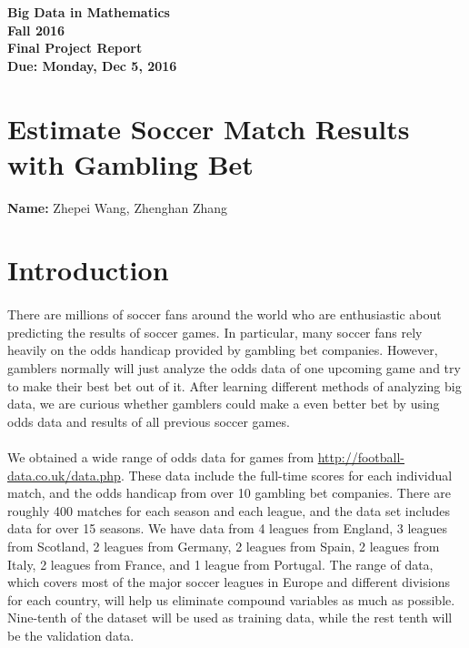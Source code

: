 \documentclass[12pt]{article}
\newcommand{\Name}[1]{\noindent \textbf{Name:} #1 \\}
\begin{document}
\begin{center}
	\bf
	Big Data in Mathematics \\
	Fall 2016 \\
	\rm
	Final Project Report \\
	Due:  Monday, Dec 5, 2016 \\
\end{center}


\section*{Estimate Soccer Match Results with Gambling Bet}

\Name{Zhepei Wang, Zhenghan Zhang} 

\section{Introduction}
\paragraph{}
There are millions of soccer fans around the world who are enthusiastic about predicting the results of soccer games. In particular, many soccer fans rely heavily on the odds handicap provided by gambling bet companies. However, gamblers normally will just analyze the odds data of one upcoming game and try to make their best bet out of it. After learning different methods of analyzing big data, we are curious whether gamblers could make a even better bet by using odds data and results of all previous soccer games.
\paragraph{}
We obtained a wide range of odds data for games from \url{http://football-data.co.uk/data.php}. These data include the full-time scores for each individual match, and the odds handicap from over 10 gambling bet companies. There are roughly 400 matches for each season and each league, and the data set includes data for over 15 seasons. We have data from 4 leagues from England, 3 leagues from Scotland, 2 leagues from Germany, 2 leagues from Spain, 2 leagues from Italy, 2 leagues from France, and 1 league from Portugal. The range of data, which covers most of the major soccer leagues in Europe and different divisions for each country, will help us eliminate compound variables  as much as possible. Nine-tenth of the dataset will be used as training data, while the rest tenth will be the validation data.
\end{document}
